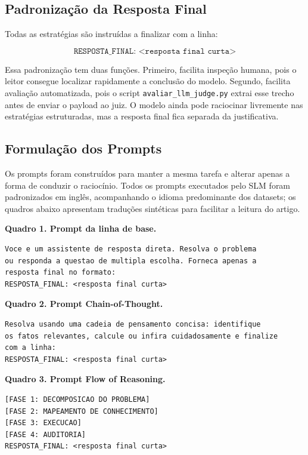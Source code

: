 \documentclass[12pt]{article}
\begin{document}
\subsection{Padronização da Resposta Final}

Todas as estratégias são instruídas a finalizar com a linha:

\[
\texttt{RESPOSTA\_FINAL: <resposta final curta>}
\]

Essa padronização tem duas funções. Primeiro, facilita inspeção humana, pois o leitor consegue localizar rapidamente a conclusão do modelo. Segundo, facilita avaliação automatizada, pois o script \texttt{avaliar\_llm\_judge.py} extrai esse trecho antes de enviar o payload ao juiz. O modelo ainda pode raciocinar livremente nas estratégias estruturadas, mas a resposta final fica separada da justificativa.

\subsection{Formulação dos Prompts}

Os prompts foram construídos para manter a mesma tarefa e alterar apenas a forma de conduzir o raciocínio. Todos os prompts executados pelo SLM foram padronizados em inglês, acompanhando o idioma predominante dos datasets; os quadros abaixo apresentam traduções sintéticas para facilitar a leitura do artigo.

\noindent\textbf{Quadro 1. Prompt da linha de base.}
\begin{verbatim}
Voce e um assistente de resposta direta. Resolva o problema
ou responda a questao de multipla escolha. Forneca apenas a
resposta final no formato:
RESPOSTA_FINAL: <resposta final curta>
\end{verbatim}

\noindent\textbf{Quadro 2. Prompt Chain-of-Thought.}
\begin{verbatim}
Resolva usando uma cadeia de pensamento concisa: identifique
os fatos relevantes, calcule ou infira cuidadosamente e finalize
com a linha:
RESPOSTA_FINAL: <resposta final curta>
\end{verbatim}

\noindent\textbf{Quadro 3. Prompt Flow of Reasoning.}
\begin{verbatim}
[FASE 1: DECOMPOSICAO DO PROBLEMA]
[FASE 2: MAPEAMENTO DE CONHECIMENTO]
[FASE 3: EXECUCAO]
[FASE 4: AUDITORIA]
RESPOSTA_FINAL: <resposta final curta>
\end{verbatim}
\end{document}
